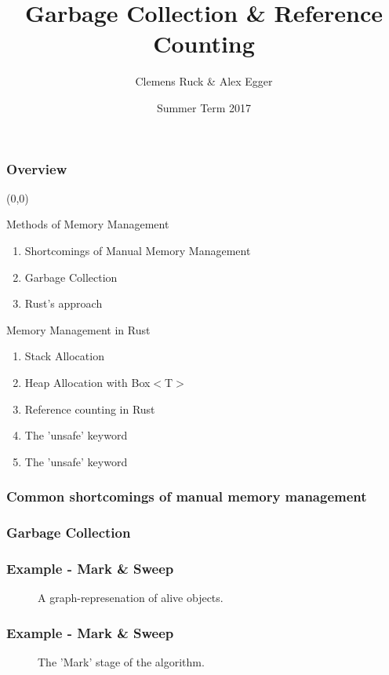 \documentclass{beamer}
\title{Garbage Collection \& Reference Counting}
\author{Clemens Ruck \& Alex Egger}
\institute[TUM]{
	\vspace{-19em}\tumheader\vspace{18em}}
\date{Summer Term 2017}
\begin{document}
\maketitle
\begin{frame}
	\frametitle{Overview}
	\begin{textblock}{6}(0,0)
		\begin{alertblock}{Methods of Memory Management}
			\begin{enumerate}
				\item Shortcomings of Manual Memory Management
				\item Garbage Collection
				\item Rust's approach
			\end{enumerate}
		\end{alertblock}
		\begin{alertblock}{Memory Management in Rust}
			\begin{enumerate}
				\item Stack Allocation
				\item Heap Allocation with Box$<$T$>$
				\item Reference counting in Rust
				\item The 'unsafe' keyword
				\item The 'unsafe' keyword
			\end{enumerate}
		\end{alertblock}
	\end{textblock}
\end{frame}
\begin{frame}
	\frametitle{Common shortcomings of manual memory management}
\end{frame}
\begin{frame}		
	\frametitle{Garbage Collection}
\end{frame}
\begin{frame}
	\frametitle{Example - Mark \& Sweep}
	\begin{figure}
		\centering
		\def\svgwidth{230pt}
		
		\caption{A graph-represenation of alive objects.}
	\end{figure}
\end{frame}
\begin{frame}
	\frametitle{Example - Mark \& Sweep}
	\begin{figure}
		\centering
		\def\svgwidth{230pt}
		
		\caption{The 'Mark' stage of the algorithm.}
	\end{figure}
\end{frame}
\end{document}
